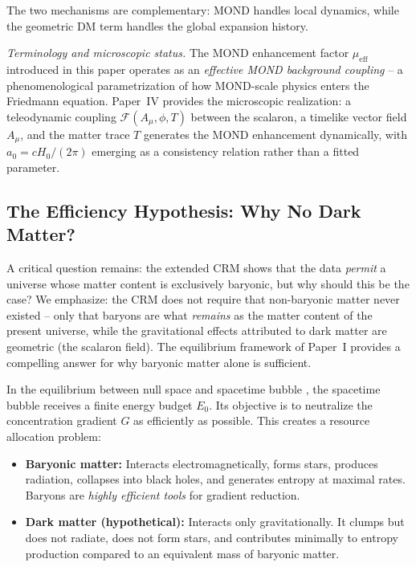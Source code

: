 \documentclass[aps,prd,twocolumn,superscriptaddress,nofootinbib,floatfix]{revtex4-2}
\begin{document}
The two mechanisms are complementary: MOND handles local dynamics, while the geometric DM term handles the global expansion history.

\textit{Terminology and microscopic status.} The MOND enhancement factor $\mu_{\mathrm{eff}}$ introduced in this paper operates as an \emph{effective MOND background coupling} -- a phenomenological parametrization of how MOND-scale physics enters the Friedmann equation. Paper~IV \cite{Geiger2026d} provides the microscopic realization: a teleodynamic coupling $\mathcal{F}(A_\mu, \phi, T)$ between the scalaron, a timelike vector field $A_\mu$, and the matter trace $T$ generates the MOND enhancement dynamically, with $a_0 = cH_0/(2\pi)$ emerging as a consistency relation rather than a fitted parameter.

\subsection{The Efficiency Hypothesis: Why No Dark Matter?}
\label{subsec:efficiency}

A critical question remains: the extended CRM shows that the data \textit{permit} a universe whose matter content is exclusively baryonic, but why should this be the case? We emphasize: the CRM does not require that non-baryonic matter never existed -- only that baryons are what \textit{remains} as the matter content of the present universe, while the gravitational effects attributed to dark matter are geometric (the scalaron field). The equilibrium framework of Paper~I \cite{Geiger2026} provides a compelling answer for why baryonic matter alone is sufficient.

In the equilibrium between null space and spacetime bubble \cite{Geiger2026}, the spacetime bubble receives a finite energy budget $E_0$. Its objective is to neutralize the concentration gradient $G$ as efficiently as possible. This creates a resource allocation problem:

\begin{itemize}
\item \textbf{Baryonic matter:} Interacts electromagnetically, forms stars, produces radiation, collapses into black holes, and generates entropy at maximal rates. Baryons are \textit{highly efficient tools} for gradient reduction.

\item \textbf{Dark matter (hypothetical):} Interacts only gravitationally. It clumps but does not radiate, does not form stars, and contributes minimally to entropy production compared to an equivalent mass of baryonic matter.
\end{itemize}
\end{document}
